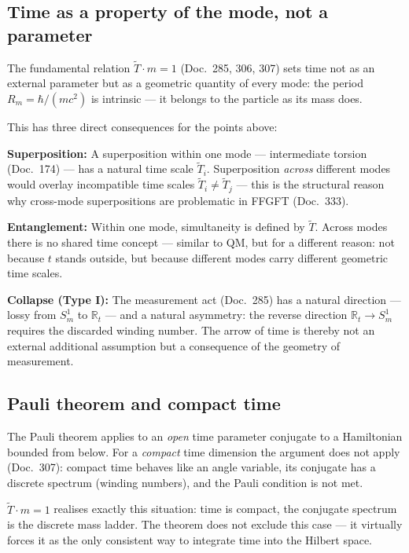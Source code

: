 \subsection{Time as a property of the mode, not a parameter}

The fundamental relation $\tilde{T}\cdot m=1$ (Doc.~285, 306, 307)
sets time not as an external parameter but as a geometric quantity
of every mode: the period $R_m=\hbar/(mc^2)$ is intrinsic — it
belongs to the particle as its mass does.

This has three direct consequences for the points above:

\textbf{Superposition:} A superposition within one mode —
intermediate torsion (Doc.~174) — has a natural time scale
$\tilde{T}_i$. Superposition \emph{across} different modes would
overlay incompatible time scales $\tilde{T}_i\neq\tilde{T}_j$ —
this is the structural reason why cross-mode superpositions are
problematic in FFGFT (Doc.~333).

\textbf{Entanglement:} Within one mode, simultaneity is defined by
$\tilde{T}$. Across modes there is no shared time concept — similar
to QM, but for a different reason: not because $t$ stands outside,
but because different modes carry different geometric time scales.

\textbf{Collapse (Type I):} The measurement act (Doc.~285) has a
natural direction — lossy from $S^1_m$ to $\mathbb{R}_t$ — and a
natural asymmetry: the reverse direction $\mathbb{R}_t\to S^1_m$
requires the discarded winding number. The arrow of time is thereby
not an external additional assumption but a consequence of the
geometry of measurement.

\subsection{Pauli theorem and compact time}

The Pauli theorem applies to an \emph{open} time parameter conjugate
to a Hamiltonian bounded from below. For a \emph{compact} time
dimension the argument does not apply (Doc.~307): compact time
behaves like an angle variable, its conjugate has a discrete spectrum
(winding numbers), and the Pauli condition is not met.

$\tilde{T}\cdot m=1$ realises exactly this situation: time is
compact, the conjugate spectrum is the discrete mass ladder. The
theorem does not exclude this case — it virtually forces it as the
only consistent way to integrate time into the Hilbert space.

